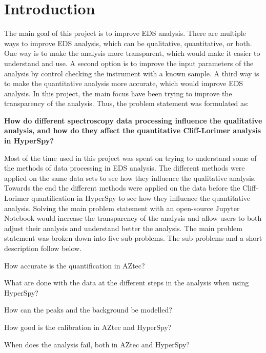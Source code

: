 \chapter{Introduction}
\label{chap:introduction}

%
%
The main goal of this project is to improve EDS analysis.
There are multiple ways to improve EDS analysis, which can be qualitative, quantitative, or both.
One way is to make the analysis more transparent, which would make it easier to understand and use.
A second option is to improve the input parameters of the analysis by control checking the instrument with a known sample.
A third way is to make the quantitative analysis more accurate, which would improve EDS analysis.
In this project, the main focus have been trying to improve the transparency of the analysis. Thus, the problem statement was formulated as:


\begin{mainprob}
    \label{mainproblem}
    \textbf{How do different spectroscopy data processing influence the qualitative analysis, and how do they affect the quantitative Cliff-Lorimer analysis in HyperSpy?}
\end{mainprob}

Most of the time used in this project was spent on trying to understand some of the methods of data processing in EDS analysis.
The different methods were applied on the same data sets to see how they  influence the qualitative analysis.
Towards the end the different methods were applied on the data before the Cliff-Lorimer quantification in HyperSpy to see how they influence the quantitative analysis.
Solving the main problem statement with an open-source Jupyter Notebook would increase the transparency of the analysis and allow users to both adjust their analysis and understand better the analysis.
The main problem statement was broken down into five sub-problems.
The sub-problems and a short description follow below.


\begin{subprob} \label{subproblem1}
    How accurate is the quantification in AZtec?
\end{subprob}
\begin{subprob} \label{subproblem2}
    What are done with the data at the different steps in the analysis when using HyperSpy?
\end{subprob}
\begin{subprob} \label{subproblem3}
    How can the peaks and the background be modelled?
\end{subprob}
\begin{subprob} \label{subproblem4}
    How good is the calibration in AZtec and HyperSpy?
\end{subprob}
\begin{subprob} \label{subproblem5}
    When does the analysis fail, both in AZtec and HyperSpy?
\end{subprob}


